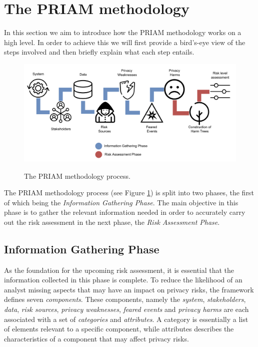 \section{The PRIAM methodology}
In this section we aim to introduce how the PRIAM methodology works on a high
level. In order to achieve this we will first provide a bird's-eye view of the
steps involved and then briefly explain what each step entails.

\begin{figure}[h!]
  \centering
  \includegraphics[width=\textwidth]{pictures/priam_model.png}
  \caption{}{The PRIAM methodology process\footnotemark.}
  \label{fig:priam}
\end{figure}


The PRIAM methodology process (see Figure \ref{fig:priam}) is split into two
phases, the first of which being the \textit{Information Gathering Phase}. The
main objective in this phase is to gather the relevant information needed in
order to accurately carry out the risk assessment in the next phase, the
\textit{Risk Assessment Phase}.

\subsection{Information Gathering Phase}
As the foundation for the upcoming risk assessment, it is essential that the
information collected in this phase is complete. To reduce the likelihood of an
analyst missing aspects that may have an impact on privacy risks, the framework
defines seven \textit{components}. These components, namely the \textit{system},
\textit{stakeholders}, \textit{data}, \textit{risk sources}, \textit{privacy
weaknesses}, \textit{feared events} and \textit{privacy harms} are each
associated with a set of \textit{categories} and \textit{attributes}. A category
is essentially a list of elements relevant to a specific component, while
attributes describes the characteristics of a component that may affect privacy
risks\cite{de2016priam}.

